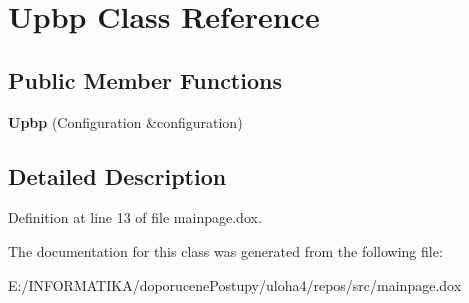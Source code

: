 \hypertarget{class_upbp}{}\section{Upbp Class Reference}
\label{class_upbp}
\subsection*{Public Member Functions}
\begin{DoxyCompactItemize}
\item 
{\bfseries Upbp} (Configuration \&configuration)\hypertarget{class_upbp_a2fbed63268522542c2aa3098f3d628be}{}\label{class_upbp_a2fbed63268522542c2aa3098f3d628be}

\end{DoxyCompactItemize}


\subsection{Detailed Description}


Definition at line 13 of file mainpage.\+dox.



The documentation for this class was generated from the following file\+:\begin{DoxyCompactItemize}
\item 
E\+:/\+I\+N\+F\+O\+R\+M\+A\+T\+I\+K\+A/doporucene\+Postupy/uloha4/repos/src/mainpage.\+dox\end{DoxyCompactItemize}
